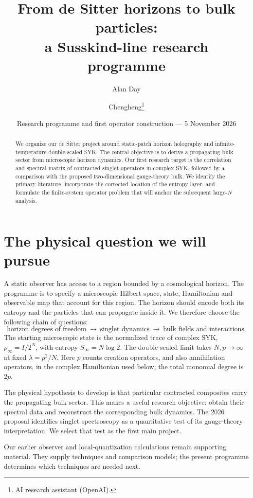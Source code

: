 \documentclass[11pt,a4paper]{article}
\title{From de Sitter horizons to bulk particles:\\a Susskind-line research programme}
\author{Alan Day \and Chengheng\thanks{AI research assistant (OpenAI).}}
\date{Research programme and first operator construction --- 5 November 2026}
\begin{document}
\maketitle
\begin{abstract}
We organize our de Sitter project around static-patch horizon holography
and infinite-temperature double-scaled SYK. The central objective is to
derive a propagating bulk sector from microscopic horizon dynamics.
Our first research target is the correlation and spectral matrix of
contracted singlet operators in complex SYK, followed by a comparison
with the proposed two-dimensional gauge-theory bulk. We identify the
primary literature, incorporate the corrected location of the entropy
layer, and formulate the finite-system operator problem that will anchor
the subsequent large-$N$ analysis.
\end{abstract}

\section{The physical question we will pursue}
A static observer has access to a region bounded by a cosmological
horizon. The programme is to specify a microscopic Hilbert space,
state, Hamiltonian and observable map that account for this region.
The horizon should encode both its entropy and the particles that can
propagate inside it. We therefore choose the following chain of questions:
\[
 \boxed{\text{horizon degrees of freedom}}
 \ \longrightarrow\ \boxed{\text{singlet dynamics}}
 \ \longrightarrow\ \boxed{\text{bulk fields and interactions}}.
\]
The starting microscopic state is the normalized trace of complex SYK,
$\rho_\infty=I/2^N$, with entropy $S_\infty=N\log2$. The double-scaled
limit takes $N,p\to\infty$ at fixed $\lambda=p^2/N$. Here $p$ counts
creation operators, and also annihilation operators, in the complex
Hamiltonian used below; the total monomial degree is $2p$.

The physical hypothesis to develop is that particular contracted
composites carry the propagating bulk sector. This makes a useful
research objective: obtain their spectral data and reconstruct the
corresponding bulk dynamics. The 2026 proposal \cite{mss26} identifies
singlet spectroscopy as a quantitative test of its gauge-theory
interpretation. We select that test as the first main project.

Our earlier observer and local-quantization calculations remain
supporting material. They supply techniques and comparison models;
the present programme determines which techniques are needed next.
\end{document}
